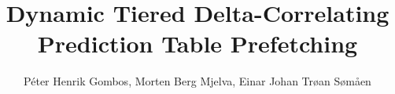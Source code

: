\documentclass[10pt]{IEEEtran}
\begin{document}
\author{Péter Henrik Gombos,
	Morten Berg Mjelva,
	Einar Johan Trøan Sømåen}
\title{Dynamic Tiered Delta-Correlating Prediction Table Prefetching}

%
{}
\maketitle









\nocite{*}
\end{document}
